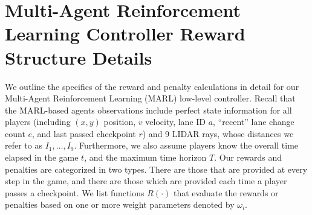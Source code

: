 \chapter{Multi-Agent Reinforcement Learning Controller Reward Structure Details} \label{app:rl_details}
We outline the specifics of the reward and penalty calculations in detail for our Multi-Agent Reinforcement Learning (MARL) low-level controller. Recall that the MARL-based agents observations include perfect state information for all players (including $(x, y)$ position, $v$ velocity, lane ID $a$, ``recent'' lane change count $e$, and last passed checkpoint $r$) and 9 LIDAR rays, whose distances we refer to as $I_1, \ldots, I_9$. Furthermore, we also assume players know the overall time elapsed in the game $t$, and the maximum time horizon $T$. 
Our rewards and penalties are categorized in two types. There are those that are provided at every step in the game, and there are those which are provided each time a player passes a checkpoint. We list functions $R(\cdot)$ that evaluate the rewards or penalties based on one or more weight parameters denoted by $\omega_i$. 

